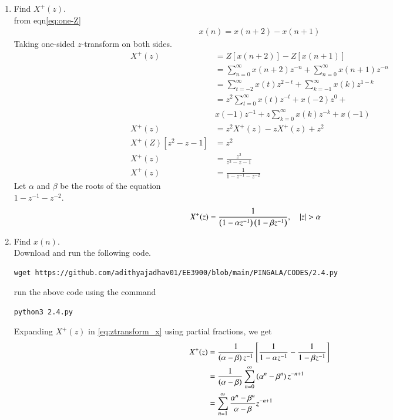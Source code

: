 \documentclass[journal,12pt,twocolumn]{IEEEtran}
\renewcommand\thesection{\arabic{section}}
\begin{document}
\begin{enumerate}[label=\thesection.\arabic*,ref=\thesection.\theenumi]
\begin{figure}[h]
\end{figure}
\item 		Find $X^{+}(z)$.\\
\solution 
from eqn\eqref{eq:one-Z} 
\begin{align}
	x(n) = x(n+2) - x(n+1)
\end{align}
Taking one-sided $z$-transform on both sides.
\begin{align}
	X^+(z) &= Z[x(n+2)] -Z[x(n+1)]\\
	&= \sum_{n=0}^{\infty}x(n+2)z^{-n} +\sum_{n=0}^{\infty}x(n+1)z^{-n} \\
	&= \sum_{t=-2}^{\infty}x(t)z^{2-t} +\sum_{k=-1}^{\infty}x(k)z^{1-k} \\
	&= z^2\sum_{t=0}^{\infty}x(t)z^{-t} + x(-2) z^0 + \nonumber\\
	& x(-1)z^{-1}+z\sum_{k=0}^{\infty}x(k)z^{-k} +x(-1)\\
	X^+(z)&= z^2 X^+(z)-z X^+(z)+z^{2}\\
	X^+(Z)[z^2-z-1]&= z^2\\
	X^+(z) &= \frac{z^2}{z^2-z-1}\\ 
	X^+(z) &= \frac{1}{1-z^{-1}-z^{-2}}
\end{align}
Let $\alpha$ and $\beta$ be the roots of the equation \\$1-z^{-1}-z^{-2}$.
\begin{align}\label{eq:ztransform_x}
	X^+(z) &= \frac{1}{\left(1 - \alpha z^{-1}\right)\left(1 - \beta z^{-1}\right)}, \quad |z| > \alpha
\end{align}
\item Find $x(n)$.\\
\solution 
Download and run the following code.
\begin{lstlisting}
wget https://github.com/adithyajadhav01/EE3900/blob/main/PINGALA/CODES/2.4.py
\end{lstlisting}
run the above code using the command
\begin{lstlisting}
python3 2.4.py
\end{lstlisting}
Expanding $X^+(z)$ in \eqref{eq:ztransform_x} using partial fractions, we get
\begin{align}
    X^+(z) &= \frac{1}{\brak{\alpha - \beta}z^{-1}}\sbrak{\frac{1}{1 - \alpha z^{-1}} - \frac{1}{1 - \beta z^{-1}}} \\
           &= \frac{1}{\brak{\alpha - \beta}}\sum_{n = 0}^{\infty}\brak{\alpha^n - \beta^n}z^{-n + 1} \\
           &= \sum_{n = 1}^{\infty}\frac{\alpha^{n} - \beta^{n}}{\alpha - \beta}z^{-n + 1} \\

\end{align}
\end{enumerate}
\end{document}
